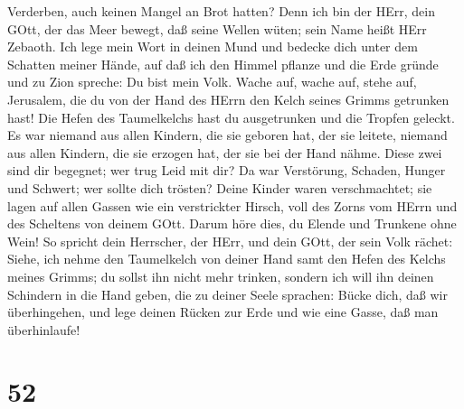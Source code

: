 Verderben, auch keinen Mangel an Brot hatten?  Denn ich bin
der HErr, dein GOtt, der das Meer bewegt, daß seine Wellen wüten; sein
Name heißt HErr Zebaoth.  Ich lege mein Wort in deinen Mund
und bedecke dich unter dem Schatten meiner Hände, auf daß ich den Himmel
pflanze und die Erde gründe und zu Zion spreche: Du bist mein Volk.
 Wache auf, wache auf, stehe auf, Jerusalem, die du von der
Hand des HErrn den Kelch seines Grimms getrunken hast! Die Hefen des
Taumelkelchs hast du ausgetrunken und die Tropfen geleckt. 
Es war niemand aus allen Kindern, die sie geboren hat, der sie leitete,
niemand aus allen Kindern, die sie erzogen hat, der sie bei der Hand
nähme.  Diese zwei sind dir begegnet; wer trug Leid mit
dir? Da war Verstörung, Schaden, Hunger und Schwert; wer sollte dich
trösten?  Deine Kinder waren verschmachtet; sie lagen auf
allen Gassen wie ein verstrickter Hirsch, voll des Zorns vom HErrn und
des Scheltens von deinem GOtt.  Darum höre dies, du Elende
und Trunkene ohne Wein!  So spricht dein Herrscher, der
HErr, und dein GOtt, der sein Volk rächet: Siehe, ich nehme den
Taumelkelch von deiner Hand samt den Hefen des Kelchs meines Grimms; du
sollst ihn nicht mehr trinken,  sondern ich will ihn deinen
Schindern in die Hand geben, die zu deiner Seele sprachen: Bücke dich,
daß wir überhingehen, und lege deinen Rücken zur Erde und wie eine
Gasse, daß man überhinlaufe!

\hypertarget{section-51}{%
\section{52}\label{section-51}}

